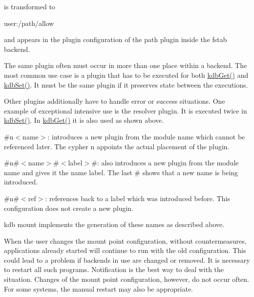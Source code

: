 

is transformed to


\begin{DoxyCode}
user:/path/allow
\end{DoxyCode}


and appears in the plugin configuration of the path plugin inside the fstab backend.

The same plugin often must occur in more than one place within a backend. The most common use case is a plugin that has to be executed for both {\ttfamily \hyperlink{group__kdb_ga28e385fd9cb7ccfe0b2f1ed2f62453a1}{kdb\+Get()}} and {\ttfamily \hyperlink{group__kdb_ga11436b058408f83d303ca5e996832bcf}{kdb\+Set()}}. It must be the same plugin if it preserves state between the executions.

Other plugins additionally have to handle error or success situations. One example of exceptional intensive use is the resolver plugin. It is executed twice in {\ttfamily \hyperlink{group__kdb_ga11436b058408f83d303ca5e996832bcf}{kdb\+Set()}}. In {\ttfamily \hyperlink{group__kdb_ga28e385fd9cb7ccfe0b2f1ed2f62453a1}{kdb\+Get()}} it is also used as shown above.


\begin{DoxyItemize}
\item {\ttfamily \#n$<$name$>$}\+: introduces a new plugin from the module {\ttfamily name} which cannot be referenced later. The cypher {\ttfamily n} appoints the actual placement of the plugin.
\item {\ttfamily \#n\#$<$name$>$\#$<$label$>$\#}\+: also introduces a new plugin from the module {\ttfamily name} and gives it the name {\ttfamily label}. The last {\ttfamily \#} shows that a new name is being introduced.
\item {\ttfamily \#n\#$<$ref$>$}\+: references back to a label which was introduced before. This configuration does not create a new plugin.
\end{DoxyItemize}

{\ttfamily kdb mount} implements the generation of these names as described above.

When the user changes the mount point configuration, without countermeasures, applications already started will continue to run with the old configuration. This could lead to a problem if backends in use are changed or removed. It is necessary to restart all such programs. Notification is the best way to deal with the situation. Changes of the mount point configuration, however, do not occur often. For some systems, the manual restart may also be appropriate.

